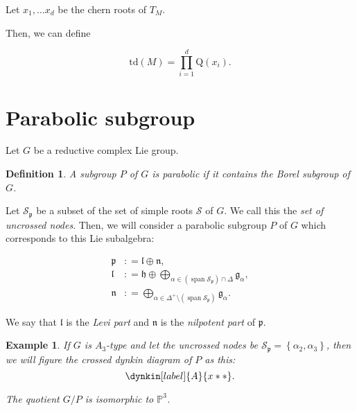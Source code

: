 \documentclass[uplatex,dvipdfmx]{jsarticle}
\newtheorem{definition}{Definition}[section]
\newtheorem{example}{Example}[section]
\newcommand{\defeq}{\mathrel{\mathop:}=}
\newcommand{\td}[1]{\mathrm{td}\left( {#1} \right)}
\begin{document}
Let 
$x_1, \ldots x_d$ 
be the chern roots of 
$T_M$.

Then, we can define

\begin{equation}
    \td{M}
    =
    \prod_{i=1}^{d}
    \mathrm{Q}(x_i).
\end{equation}


\section{Parabolic subgroup}

Let
$G$
be a reductive complex Lie group.

\begin{definition}
    A subgroup
    $P$
    of
    $G$
    is \textit{parabolic} if it contains the Borel subgroup of
    $G$.
\end{definition}

Let
$\mathcal{S}_{\mathfrak{p}}$
be a subset of the set of simple roots
$\mathcal{S}$
of 
$G$.
We call this the \textit{set of uncrossed nodes}.
Then, we will consider a parabolic subgroup
$P$
of
$G$
which corresponds to this Lie subalgebra:

\begin{align}
    \mathfrak{p} &\defeq 
        \mathfrak{l} 
        \oplus 
        \mathfrak{n}, \\
    \mathfrak{l} &\defeq
        \mathfrak{h}
        \oplus
        \bigoplus_{\alpha \in (\operatorname{span} \mathcal{S}_{\mathfrak{p}}) \cap \Delta}
            \mathfrak{g}_\alpha, \\
    \mathfrak{n} &\defeq
        \bigoplus_{\alpha \in \Delta^+ \setminus (\operatorname{span} \mathcal{S}_{\mathfrak{p}})}
            \mathfrak{g}_\alpha.
\end{align}

We say that
$\mathfrak{l}$
is the \textit{Levi part} and
$\mathfrak{n}$
is the \textit{nilpotent part} of
$\mathfrak{p}$.

\begin{example}
    If
    $G$
    is
    $A_3$-type
    and let the uncrossed nodes be
    $\mathcal{S}_{\mathfrak{p}} = \left\{ \alpha_2, \alpha_3 \right\}$,
    then we will figure the crossed dynkin diagram of
    $P$
    as this:
    \begin{equation}
        \dynkin[label]{A}{x**}.
    \end{equation}

    The quotient
    $G/P$
    is isomorphic to
    $\mathbb{P}^3$.
\end{example}
\end{document}
